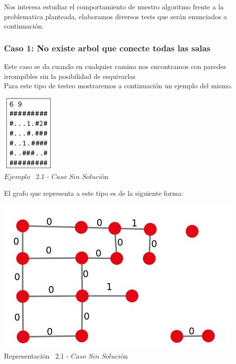 \indent Nos interesa estudiar el comportamiento de nuestro algoritmo frente a la problematica planteada, elaboramos diversos tests que ser\'an enunciados a continuaci\'on.\\

\begin{center}
 \subsubsection*{Caso 1: No existe arbol que conecte todas las salas}
\end{center}

Este caso se da cuando en cualquier camino nos encontramos con paredes irrompibles sin la posibilidad de esquivarlas\\

 Para este tipo de testeo mostraremos a continuaci\'on un ejemplo del mismo.\\
 
\vspace*{0.3cm} \vspace*{0.3cm}
  \begin{center}
 \includegraphics[scale=1.6]{./EJ2/ej2sinsolucion.jpeg}
\\{$Ejemplo$ \ 2.1 - $Caso$ $Sin$ $Soluci$\'on}
  \end{center}
  \vspace*{0.3cm}

El grafo que representa a este tipo es de la siguiente forma:\\

\vspace*{0.3cm} \vspace*{0.3cm}
  \begin{center}
 \includegraphics[scale=0.5]{./EJ2/ej2grafosinsolucion.jpeg}
 \\{Representación \ 2.1 - $Caso$ $Sin$ $Soluci$\'on}
  \end{center}
  \vspace*{0.3cm}

